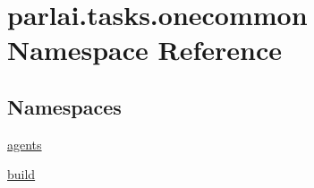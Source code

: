 \hypertarget{namespaceparlai_1_1tasks_1_1onecommon}{}\section{parlai.\+tasks.\+onecommon Namespace Reference}
\label{namespaceparlai_1_1tasks_1_1onecommon}
\subsection*{Namespaces}
\begin{DoxyCompactItemize}
\item 
 \hyperlink{namespaceparlai_1_1tasks_1_1onecommon_1_1agents}{agents}
\item 
 \hyperlink{namespaceparlai_1_1tasks_1_1onecommon_1_1build}{build}
\end{DoxyCompactItemize}
